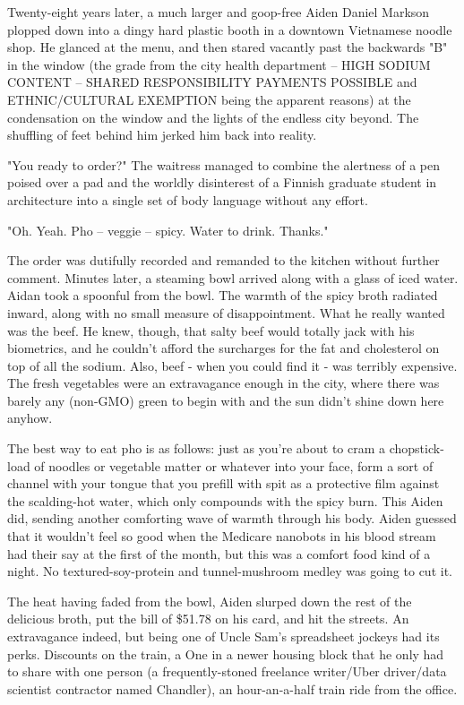 \documentclass[11pt]{book}
\begin{document}
	Twenty-eight years later, a much larger and goop-free Aiden Daniel Markson plopped down into a dingy hard plastic booth in a downtown Vietnamese noodle shop. He glanced at the menu, and then stared vacantly past the backwards "B" in the window (the grade from the city health department – HIGH SODIUM CONTENT – SHARED RESPONSIBILITY PAYMENTS POSSIBLE and ETHNIC/CULTURAL EXEMPTION being the apparent reasons) at the condensation on the window and the lights of the endless city beyond. The shuffling of feet behind him jerked him back into reality.
	
	"You ready to order?" The waitress managed to combine the alertness of a pen poised over a pad and the worldly disinterest of a Finnish graduate student in architecture into a single set of body language without any effort.
	
	"Oh. Yeah. Pho – veggie – spicy. Water to drink. Thanks."
	
	The order was dutifully recorded and remanded to the kitchen without further comment. Minutes later, a steaming bowl arrived along with a glass of iced water. Aidan took a spoonful from the bowl. The warmth of the spicy broth radiated inward, along with no small measure of disappointment. What he really wanted was the beef. He knew, though, that salty beef would totally jack with his biometrics, and he couldn't afford the surcharges for the fat and cholesterol on top of all the sodium. Also, beef - when you could find it - was terribly expensive. The fresh vegetables were an extravagance enough in the city, where there was barely any (non-GMO) green to begin with and the sun didn't shine down here anyhow. 
	
	The best way to eat pho is as follows: just as you're about to cram a chopstick-load of noodles or vegetable matter or whatever into your face, form a sort of channel with your tongue that you prefill with spit as a protective film against the scalding-hot water, which only compounds with the spicy burn. This Aiden did, sending another comforting wave of warmth through his body. Aiden guessed that it wouldn't feel so good when the Medicare nanobots in his blood stream had their say at the first of the month, but this was a comfort food kind of a night. No textured-soy-protein and tunnel-mushroom medley was going to cut it.
	
	The heat having faded from the bowl, Aiden slurped down the rest of the delicious broth, put the bill of \$51.78 on his card, and hit the streets. An extravagance indeed, but being one of Uncle Sam’s spreadsheet jockeys had its perks. Discounts on the train, a One in a newer housing block that he only had to share with one person (a frequently-stoned freelance writer/Uber driver/data scientist contractor named Chandler), an hour-an-a-half train ride from the office.
	
\end{document}
